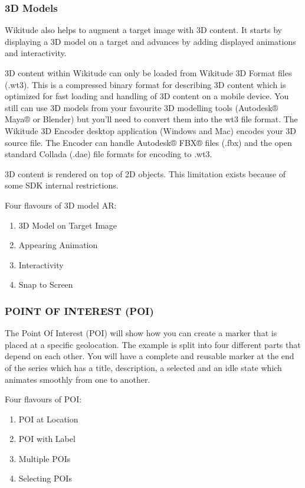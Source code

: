 \documentclass{article}
\begin{document}
\subsubsection{3D Models}
\par Wikitude also helps to augment a target image with 3D content. It starts by displaying a 3D model on a target and advances by adding displayed animations and interactivity.
\par 3D content within Wikitude can only be loaded from Wikitude 3D Format files (.wt3). This is a compressed binary format for describing 3D content which is optimized for fast loading and handling of 3D content on a mobile device. You still can use 3D models from your favourite 3D modelling tools (Autodesk® Maya® or Blender) but you'll need to convert them into the wt3 file format. The Wikitude 3D Encoder desktop application (Windows and Mac) encodes your 3D source file. The Encoder can handle Autodesk® FBX® files (.fbx) and the open standard Collada (.dae) file formats for encoding to .wt3. 
\par 3D content is rendered on top of 2D objects. This limitation exists because of some SDK internal restrictions. 
\par Four flavours of 3D model AR: 
\begin{enumerate}
\item  3D Model on Target Image
\item Appearing Animation 
\item Interactivity
\item Snap to Screen 
\end{enumerate}
\fi

\subsubsection{POINT OF INTEREST (POI) }
\par The Point Of Interest (POI) will show how you can create a marker that is placed at a specific geolocation. The example is split into four different parts that depend on each other. You will have a complete and reusable marker at the end of the series which has a title, description, a selected and an idle state which animates smoothly from one to another. 
\par Four flavours of POI:
\begin{enumerate}
\item POI at Location 
\item POI with Label 
\item Multiple POIs 
\item Selecting POIs
\end{enumerate}
\end{document}
